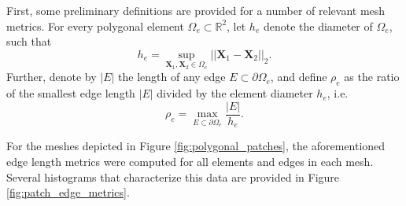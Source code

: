 First, some preliminary definitions are provided for a number of relevant mesh metrics. For every polygonal element $\Omega_e \subset \mathbb{R}^2$, let $h_e$ denote the diameter of $\Omega_e$, such that
\begin{equation}
	h_e = \sup_{\bm{X}_1, \bm{X}_2 \in \Omega_e} || \bm{X}_1 - \bm{X}_2 ||_2.
\end{equation}
Further, denote by $|E|$ the length of any edge $E \subset \partial \Omega_e$, and define $\rho_e$ as the ratio of the smallest edge length $|E|$ divided by the element diameter $h_e$, i.e.
\begin{equation}
	\rho_e = \max_{E \subset \partial \Omega_e} \frac{|E|}{h_e}.
\end{equation}

For the meshes depicted in Figure \ref{fig:polygonal_patches}, the aforementioned edge length metrics were computed for all elements and edges in each mesh. Several histograms that characterize this data are provided in Figure \ref{fig:patch_edge_metrics}.
